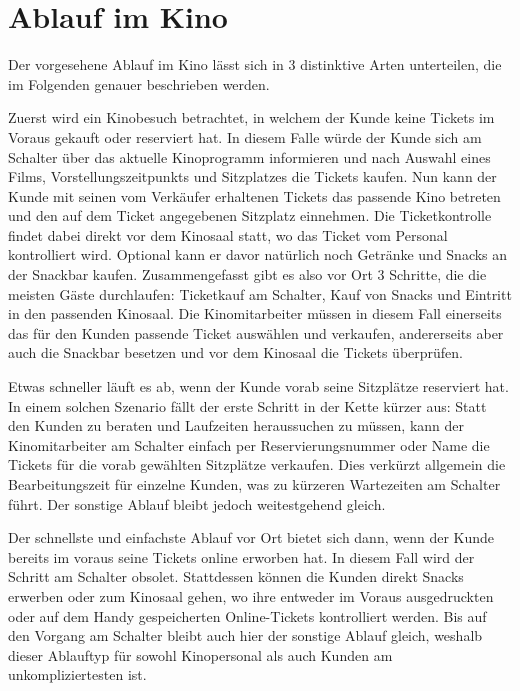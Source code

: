 \section{Ablauf im Kino}

Der vorgesehene Ablauf im Kino lässt sich in 3 distinktive Arten unterteilen, die im Folgenden genauer beschrieben werden.

Zuerst wird ein Kinobesuch betrachtet, in welchem der Kunde keine Tickets im Voraus gekauft oder reserviert hat.
In diesem Falle würde der Kunde sich am Schalter über das aktuelle Kinoprogramm informieren und nach Auswahl eines Films, Vorstellungszeitpunkts und Sitzplatzes die Tickets kaufen.
Nun kann der Kunde mit seinen vom Verkäufer erhaltenen Tickets das passende Kino betreten und den auf dem Ticket angegebenen Sitzplatz einnehmen.
Die Ticketkontrolle findet dabei direkt vor dem Kinosaal statt, wo das Ticket vom Personal kontrolliert wird.
Optional kann er davor natürlich noch Getränke und Snacks an der Snackbar kaufen. 
Zusammengefasst gibt es also vor Ort 3 Schritte, die die meisten Gäste durchlaufen:
Ticketkauf am Schalter, Kauf von Snacks und Eintritt in den passenden Kinosaal.
Die Kinomitarbeiter müssen in diesem Fall einerseits das für den Kunden passende Ticket auswählen und verkaufen, andererseits aber auch die Snackbar besetzen und vor dem Kinosaal die Tickets überprüfen.

Etwas schneller läuft es ab, wenn der Kunde vorab seine Sitzplätze reserviert hat.
In einem solchen Szenario fällt der erste Schritt in der Kette kürzer aus:
Statt den Kunden zu beraten und Laufzeiten heraussuchen zu müssen, kann der Kinomitarbeiter am Schalter einfach per Reservierungsnummer oder Name die Tickets für die vorab gewählten Sitzplätze verkaufen.
Dies verkürzt allgemein die Bearbeitungszeit für einzelne Kunden, was zu kürzeren Wartezeiten am Schalter führt.
Der sonstige Ablauf bleibt jedoch weitestgehend gleich.

Der schnellste und einfachste Ablauf vor Ort bietet sich dann, wenn der Kunde bereits im voraus seine Tickets online erworben hat.
In diesem Fall wird der Schritt am Schalter obsolet.
Stattdessen können die Kunden direkt Snacks erwerben oder zum Kinosaal gehen, wo ihre entweder im Voraus ausgedruckten oder auf dem Handy gespeicherten Online-Tickets kontrolliert werden.
Bis auf den Vorgang am Schalter bleibt auch hier der sonstige Ablauf gleich, weshalb dieser Ablauftyp für sowohl Kinopersonal als auch Kunden am unkompliziertesten ist.